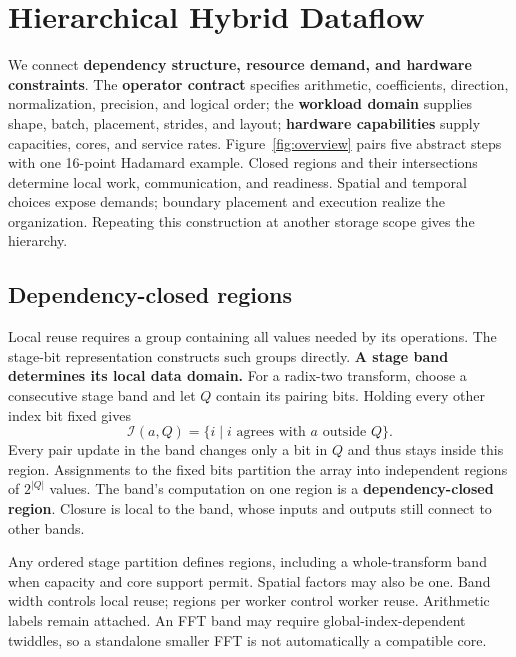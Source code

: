 \section{Hierarchical Hybrid Dataflow}
\label{sec:method}


We connect \textbf{dependency structure,
resource demand, and hardware constraints}. The \textbf{operator contract} specifies arithmetic,
coefficients, direction, normalization, precision, and logical order; the
\textbf{workload domain} supplies shape, batch, placement, strides, and layout;
\textbf{hardware capabilities} supply capacities, cores, and service rates.
Figure~\ref{fig:overview} pairs five abstract steps with one 16-point Hadamard
example. Closed regions and their intersections determine local work,
communication, and readiness. Spatial and temporal choices expose demands;
boundary placement and execution realize the organization. Repeating this
construction at another storage scope gives the hierarchy.

\subsection{Dependency-closed regions}
\label{sec:region-construction}
Local reuse requires a group containing all values needed by its operations.
The stage-bit representation constructs such groups directly.
\textbf{A stage band determines its local data domain.}
For a radix-two transform, choose a consecutive stage band and let $Q$
contain its pairing bits. Holding every other index bit fixed gives
\begin{equation}
\mathcal I(a,Q)=\{i\mid i\text{ agrees with }a\text{ outside }Q\}.
\label{eq:component}
\end{equation}
Every pair update in the band changes only a bit in $Q$ and thus stays inside
this region. Assignments to the fixed bits partition the array into
independent regions of $2^{|Q|}$ values. The band's computation on one region
is a \textbf{dependency-closed region}. Closure is local to the band, whose
inputs and outputs still connect to other bands.

Any ordered stage partition defines regions, including a whole-transform
band when capacity and core support permit. Spatial factors may also be one.
Band width controls local reuse; regions per worker control worker reuse.
Arithmetic labels remain attached. An FFT band may require global-index-dependent
twiddles, so a standalone smaller FFT is not automatically a compatible core.


